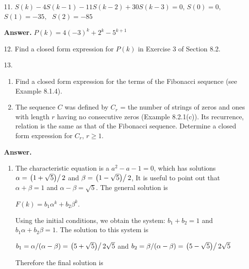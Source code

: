 \documentclass[10pt,]{book}
\theoremstyle{plain}
\theoremstyle{definition}
\theoremstyle{definition}
\theoremstyle{definition}
\theoremstyle{definition}
\numberwithin{equation}{section}
\begin{document}
\begin{exercisegroup}
\par\smallskip
\item[11.]\hypertarget{exercise-22}{} \(S(k) - 4S(k - 1) - 11S(k- 2)+ 30S(k - 3) = 0\), 
 \(S(0) = 0\),\(S(1) = -35,\textrm{  }S(2) = -85\)%
\par\smallskip
\par\smallskip
\noindent\textbf{Answer.}\hypertarget{answer-12}{}\quad
 \(P(k)=4(-3)^k+2^k-5^{k+1}\)%
\item[12.]\hypertarget{exercise-23}{}Find a closed form expression for \(P(k)\) in Exercise 3 of Section 8.2.%
\par\smallskip
\item[13.]\hypertarget{exercise-24}{}\leavevmode%
\begin{enumerate}[label=\alph*]
\item\hypertarget{li-74}{}Find a closed form expression for the terms of the Fibonacci sequence (see Example 8.1.4).%
\item\hypertarget{li-75}{}The sequence \(C\) was defined by \(C_r\) = the number of strings of zeros and ones with length \(r\) having no consecutive
zeros (Example 8.2.1(c)). Its recurrence, relation is the same as that of the Fibonacci sequence. Determine a closed form expression for \(C_r\),
\(r \geq  1\).%
\end{enumerate}
%
\par\smallskip
\par\smallskip
\noindent\textbf{Answer.}\hypertarget{answer-13}{}\quad
\leavevmode%
\begin{enumerate}[label=\alph*]
\item\hypertarget{li-76}{}The characteristic equation is a \(a^2-a-1=0\), which has solutions \(\alpha =\left.\left(1+\sqrt{5}\right)\right/2\) and \(\beta =\left.\left(1-\sqrt{5}\right)\right/2\), It is useful to point out that \(\alpha +\beta =1\) and \(\alpha -\beta =\sqrt{5}\). The general solution is

\(F(k)=b_1\alpha ^k+b_2\beta ^k\).

Using the initial conditions, we obtain the system: \(b_1+b_2=1\) and \(b_1\alpha +b_2\beta =1\). The solution to this system is

 \(b_1=\alpha /(\alpha -\beta )=\left.\left(5+\sqrt{5}\right)\right/2\sqrt{5}\)
and  \(b_2=\beta /(\alpha -\beta )=\left.\left(5-\sqrt{5}\right)\right/2\sqrt{5}\) %
\par
Therefore the final solution is


\end{enumerate}
\end{exercisegroup}
\end{document}
